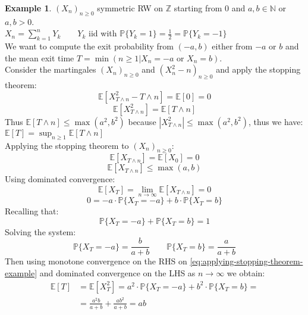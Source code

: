 \documentclass[10pt,a4paper]{article}
\theoremstyle{definition}
\newtheorem{exi}{Example}[section]
\begin{document}
\begin{exi}
	$(X_n)_{n\geq0}$ symmetric RW on $\mathbb{Z}$ starting from $0$ and $a,b\in\mathbb{N}$ or $a,b>0$.\\
	$X_n=\sum_{k=1}^{n}Y_k \qquad Y_k$ iid with $\mathbb{P}\{Y_k=1\}=\frac{1}{2}=\mathbb{P}\{Y_k=-1\}$ \\
	We want to compute the exit probability from $(-a,b)$ either from $-a$ or $b$ and the mean exit time $T=\min{(n\geq1|X_n=-a \text{ or } X_n=b)}$. \\
	Consider the martingales $(X_n)_{n\geq0}$ and $(X^2_n-n)_{n\geq0}$ and apply the stopping theorem: 
	\begin{equation*}
		\mathbb{E}[X^2_{T\land n}-T\land n]=\mathbb{E}[0]=0
	\end{equation*}
	\begin{equation}
		\mathbb{E}[X^2_{T\land n}]=\mathbb{E}[T\land n]
		\label{eq:applying-stopping-theorem-example}
	\end{equation}
Thus $ \mathbb{E}[T\land n]\leq\max{(a^2,b^2)} $ because $  |X^2_{T\land n}|\leq\max{(a^2,b^2)}$, thus we have: $\mathbb{E}[T]=\sup_{n\geq1}\mathbb{E}[T\land n]$\\
	Applying the stopping theorem to $(X_n)_{n\geq0}$:
	\begin{equation*}
		\mathbb{E}[X_{T\land n}]=\mathbb{E}[X_0]=0
	\end{equation*}
\begin{equation*}
	\mathbb{E}[X_{T\land n}]\leq\max{(a,b)}
\end{equation*}                                                 
Using dominated convergence:                                    
\begin{equation*}                                               
	\mathbb{E}[X_{T}]=\lim_{n\to\infty}\mathbb{E}[X_{T\land n}]=0
\end{equation*}
\begin{equation*}                                               
	0=-a\cdot\mathbb{P}\{X_T=-a\}+b\cdot\mathbb{P}\{X_T=b\}
\end{equation*}
Recalling that:
\begin{equation*}                                               
	\mathbb{P}\{X_T=-a\}+\mathbb{P}\{X_T=b\}=1
\end{equation*}
Solving the system:
\begin{equation*}                                               
	\mathbb{P}\{X_T=-a\}=\frac{b}{a+b} \qquad \mathbb{P}\{X_T=b\}=\frac{a}{a+b}
\end{equation*}
Then using monotone convergence on the RHS on \eqref{eq:applying-stopping-theorem-example} and dominated convergence on the LHS as $n\to\infty$ we obtain:
\begin{equation*}  
	\begin{split}
		\mathbb{E}[T]&=\mathbb{E}[X^2_T]=a^2\cdot\mathbb{P}\{X_T=-a\}+b^2\cdot\mathbb{P}\{X_T=b\}=\\&=\frac{a^2b}{a+b}+\frac{ab^2}{a+b}=ab
	\end{split}                                             
\end{equation*}
\end{exi}
\end{document}
